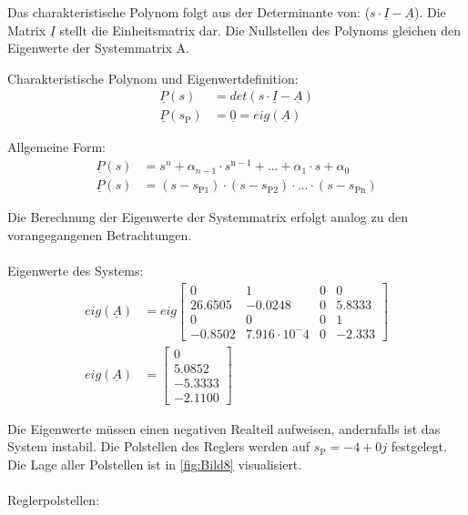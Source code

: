 Das charakteristische Polynom folgt aus der Determinante von: ($s\cdot\underline{I}-\underline{A}$). Die Matrix $\underline{I}$ stellt die Einheitsmatrix dar. Die Nullstellen des Polynoms gleichen den Eigenwerte der Systemmatrix A.

\clearpage

Charakteristische Polynom und Eigenwertdefinition:
\begin{align*}
    \underline{P}(s) &= det(s\cdot\underline{I}-\underline{A}) \\
    \underline{P}(s_{\mathrm{P}}) &= \underline{0} = eig(\underline{A})
\end{align*}

Allgemeine Form:
\begin{align*}
        \underline{P}(s) &= s^n+\alpha_{n-1}\cdot s^{\mathrm{n-1}}+...+\alpha_{\mathrm{1}}\cdot s + \alpha_{\mathrm{0}} \\
        \underline{P}(s) &= (s-s_{\mathrm{P1}})\cdot(s-s_{\mathrm{P2}})\cdot ... \cdot (s-s_{\mathrm{Pn}})
\end{align*}

Die Berechnung der Eigenwerte der Systemmatrix erfolgt analog zu den vorangegangenen Betrachtungen.\\\\
Eigenwerte des Systems:
\begin{align}\label{eq:Gleichung36}
    eig(\underline{A}) &= eig
    \begin{bmatrix}
        0 & 1 & 0 & 0 \\
        26.6505 & -0.0248 & 0 & 5.8333 \\
        0 & 0 & 0 & 1 \\
        -0.8502 & 7.916\cdot10^-4 & 0 & -2.333
    \end{bmatrix} \nonumber\\
    eig(\underline{A}) &=
    \begin{bmatrix}
        0 \\
        5.0852 \\
        -5.3333 \\
        -2.1100
    \end{bmatrix}
\end{align}

Die Eigenwerte müssen einen negativen Realteil aufweisen, andernfalls ist das System instabil. Die Polstellen des Reglers werden auf $s_{\mathrm{P}} = -4+0j$ festgelegt. Die Lage aller Polstellen ist in \autoref{fig:Bild8} visualisiert.\\\\
Reglerpolstellen:

